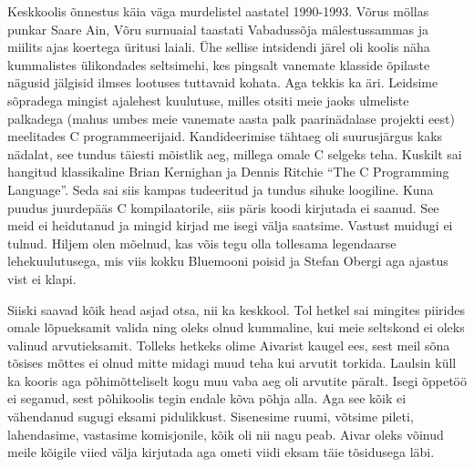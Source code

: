 Keskkoolis õnnestus käia väga murdelistel aastatel 1990-1993. Võrus möllas 
punkar Saare Ain, Võru surnuaial 
taastati Vabadussõja mälestussammas ja miilits ajas koertega üritusi laiali. 
Ühe sellise intsidendi järel oli koolis näha kummalistes ülikondades 
seltsimehi, kes pingsalt vanemate klasside õpilaste nägusid jälgisid ilmses 
lootuses tuttavaid kohata. Aga tekkis ka äri. Leidsime sõpradega mingist 
ajalehest kuulutuse, milles otsiti meie jaoks ulmeliste palkadega (mahus umbes 
meie vanemate aasta palk paarinädalase projekti eest) meelitades C 
programmeerijaid. Kandideerimise tähtaeg oli suurusjärgus kaks nädalat, see 
tundus täiesti mõistlik aeg, millega omale C selgeks teha. Kuskilt sai hangitud 
klassikaline Brian Kernighan ja Dennis Ritchie \enquote{The C Programming 
Language}. Seda sai siis kampas tudeeritud ja tundus 
sihuke loogiline. Kuna puudus juurdepääs C kompilaatorile, siis päris koodi 
kirjutada ei saanud. See meid ei heidutanud ja mingid kirjad me isegi välja 
saatsime. Vastust muidugi ei tulnud. Hiljem olen mõelnud, kas võis tegu olla 
tollesama legendaarse lehekuulutusega, mis viis kokku Bluemooni 
poisid ja Stefan Obergi aga ajastus vist ei klapi. 

Siiski saavad kõik head asjad otsa, nii ka keskkool. Tol hetkel sai mingites 
piirides omale lõpueksamit valida ning oleks olnud kummaline, kui meie 
seltskond ei oleks valinud arvutieksamit. Tolleks hetkeks olime Aivarist kaugel 
ees, sest meil sõna tõsises mõttes ei olnud mitte midagi muud teha kui arvutit 
torkida. Laulsin küll ka kooris 
aga põhimõtteliselt kogu muu vaba aeg oli arvutite päralt. Isegi õppetöö ei 
seganud, sest põhikoolis tegin endale kõva põhja alla. Aga see kõik ei 
vähendanud sugugi eksami pidulikkust. Sisenesime ruumi, võtsime pileti, 
lahendasime, vastasime komisjonile, kõik oli nii nagu peab. Aivar oleks võinud 
meile kõigile viied välja kirjutada aga ometi viidi eksam täie tõsidusega läbi. 

